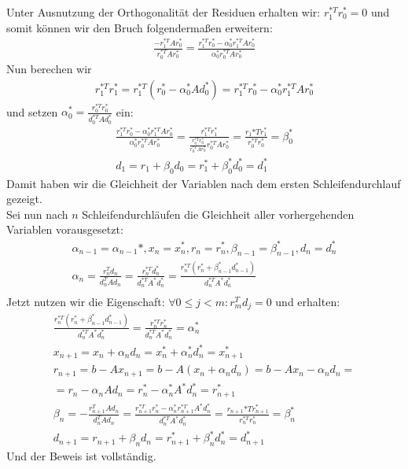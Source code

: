 Unter Ausnutzung der Orthogonalität der Residuen erhalten wir: $r_1^{*T}r_0^* = 0$ und somit können wir den Bruch
folgendermaßen erweitern:
\begin{align*}
  \frac{-r_1^{*T}Ar_0^*}{r_0^{*T}Ar_0^*} = \frac{r_1^{*T}r_0^* -\alpha_0^*r_1^{*T}Ar_0^*}{\alpha_0^*r_0^{*T}Ar_0^*}
\end{align*}
Nun berechen wir
\begin{align*}
  r_1^{*T}r_1^* = r_1^{*T}(r_0^*-\alpha_0^*Ad_0^*) = r_1^{*T}r_0^* - \alpha_0^*r_1^{*T}Ar_0^*
\end{align*}
und setzen $\alpha_0^* = \frac{r_0^{*T}r_0^*}{d_0^{*T}Ad_0^*}$ ein:
\begin{align*}
  \frac{r_1^{*T}r_0^* -\alpha_0^*r_1^{*T}Ar_0^*}{\alpha_0^*r_0^{*T}Ar_0^*} = \frac{r_1^{*T}r_1^*}{\frac{r_0^{*T}r_0^*}{r_0^{*T}Ar_0^*}r_0^{*T}Ar_0^*}
  = \frac{r_1{*T}r_1^*}{r_0^{*T}r_0^*} = \beta_0^* \\
  d_1 = r_1 + \beta_0d_0 = r_1^* + \beta_0^*d_0^* = d_1^*
\end{align*}
Damit haben wir die Gleichheit der Variablen nach dem ersten Schleifendurchlauf gezeigt. \\
Sei nun nach $n$ Schleifendurchläufen die Gleichheit aller vorhergehenden Variablen vorausgesetzt: \\
\begin{align*}
  \alpha_{n-1} = \alpha_{n-1}*, x_n = x_n^*, r_n = r_n^*, \beta_{n-1} = \beta_{n-1}^*, d_n = d_n^* \\
  \alpha_n = \frac{r_n^Td_n}{d_n^TAd_n} = \frac{r_n^{*T}d_n^*}{d_n^{*T}A^*d_n^*} = \frac{r_n^{*T}(r_n^* + \beta_{n-1}^*d_{n-1}^*)}{d_n^{*T}A^*d_n^*} \\
\end{align*}
Jetzt nutzen wir die Eigenschaft: $\forall 0 \leq j < m: r_m^Td_j = 0$ und erhalten:
\begin{align*}
  \frac{r_n^{*T}(r_n^* + \beta_{n-1}^*d_{n-1}^*)}{d_n^{*T}A^*d_n^*} = \frac{r_n^{*T}r_n^*}{d_n^{*T}A^*d_n^*} = \alpha_n^* \\
  x_{n+1} = x_n + \alpha_nd_n = x_n^* + \alpha_n^*d_n^* = x_{n+1}^* \\
  r_{n+1} = b - Ax_{n+1} = b - A(x_n + \alpha_nd_n) = b - Ax_n - \alpha_nd_n = \\
  = r_n - \alpha_nAd_n = r_n^* - \alpha_n^*A^*d_n^* = r_{n+1}^* \\
  \beta_n = - \frac{r_{n+1}^TAd_n}{d_n^TAd_n} = \frac{r_{n+1}^{*T}r_n^* - \alpha_n^*r_{n+1}^{*T}A^*d_n^*}{d_n^{*T}A^*d_n^*}
  = \frac{r_{n+1}{*T}r_{n+1}^*}{r_n^{*T}r_n^*} = \beta_n^* \\
  d_{n+1} = r_{n+1} + \beta_nd_n = r_{n+1}^* + \beta_n^*d_n^* = d_{n+1}^*
\end{align*}
Und der Beweis ist vollständig. \\

